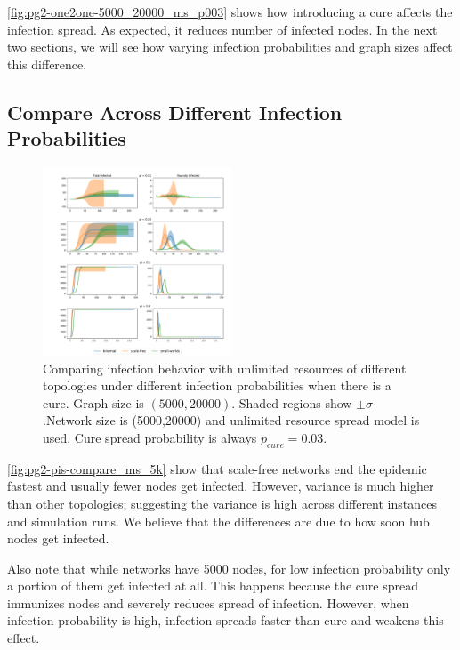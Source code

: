 \documentclass[conference]{IEEEtran}
\begin{document}
\autoref{fig:pg2-one2one-5000_20000_ms_p003} shows how introducing a cure affects the infection spread. As expected, it reduces number of infected nodes. In the next two sections, we will see how varying infection probabilities and graph sizes affect this difference.

\subsection{Compare Across Different Infection Probabilities}\label{sec:pg2-compares-pis}

\begin{figure}[htb]
  \begin{center}
	\includegraphics[width=0.5\textwidth]{img/pg2-pis-compare_ms_5k.pdf}
  \end{center}
	\caption{Comparing infection behavior with unlimited resources of different topologies under different infection probabilities when there is a cure. Graph  size is $(5000,20000)$. Shaded regions show $\pm \sigma$.Network size is (5000,20000) and unlimited resource spread model is used. Cure spread probability is always $p_{cure} = 0.03$.}
	\label{fig:pg2-pis-compare_ms_5k}
\end{figure}

\autoref{fig:pg2-pis-compare_ms_5k} show that scale-free networks end the epidemic fastest and usually fewer nodes get infected. However, variance is much higher than other topologies; suggesting the variance is high across different instances and simulation runs. We believe that the differences are due to how soon hub nodes get infected.

Also note that while networks have 5000 nodes, for low infection probability only a portion of them get infected at all. This happens because the cure spread immunizes nodes and severely reduces spread of infection. However, when infection probability is high, infection spreads faster than cure and weakens this effect.
\end{document}
